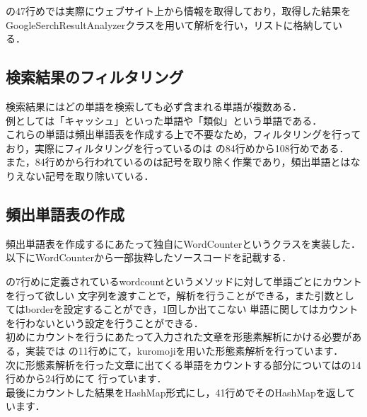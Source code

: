 の47行めでは実際にウェブサイト上から情報を取得しており，取得した結果を
GoogleSerchResultAnalyzerクラスを用いて解析を行い，リストに格納している．\\



\subsection{検索結果のフィルタリング}
検索結果にはどの単語を検索しても必ず含まれる単語が複数ある．\\
例としては「キャッシュ」といった単語や「類似」という単語である．\\
これらの単語は頻出単語表を作成する上で不要なため，フィルタリングを行っており，実際にフィルタリングを行っているのは
の84行めから108行めである．
また，84行めから行われているのは記号を取り除く作業であり，頻出単語とはなりえない記号を取り除いている．\\

\subsection{頻出単語表の作成}
頻出単語表を作成するにあたって独自にWordCounterというクラスを実装した．\\

以下にWordCounterから一部抜粋したソースコードを記載する．



の7行めに定義されているwordcountというメソッドに対して単語ごとにカウントを行って欲しい
文字列を渡すことで，解析を行うことができる，また引数としてはborderを設定することができ，1回しか出てこない
単語に関してはカウントを行わないという設定を行うことができる．\\

初めにカウントを行うにあたって入力された文章を形態素解析にかける必要がある，実装では
の11行めにて，kuromojiを用いた形態素解析を行っています．
\\

次に形態素解析を行った文章に出てくる単語をカウントする部分についてはの14行めから24行めにて
行っています．\\

最後にカウントした結果をHashMap形式にし，41行めでそのHashMapを返しています．\\

